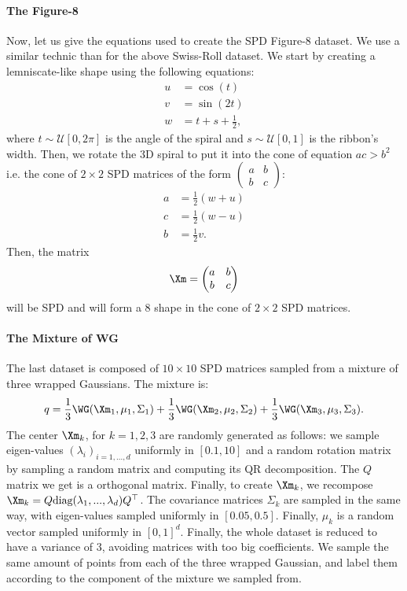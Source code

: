 \documentclass[10pt]{article} %
\theoremstyle{plain}
\theoremstyle{definition}
\theoremstyle{remark}
\begin{document}
\paragraph{The Figure-8}
Now, let us give the equations used to create the SPD Figure-8 dataset. We use a similar technic than for the above Swiss-Roll dataset. We start by creating a lemniscate-like shape using the following equations:
\begin{equation}
  \begin{aligned}
    u &= \cos(t) \\
    v &= \sin(2t) \\
    w &= t + s + \frac{1}{2},
  \end{aligned}
\end{equation}
where $t \sim \mathcal{U}[0, 2\pi]$ is the angle of the spiral and $s \sim \mathcal{U}[0, 1]$ is the ribbon's width. Then, we rotate the 3D spiral to put it into the cone of equation $ac > b^2$ i.e. the cone of $2 \times 2$ SPD matrices of the form $
\begin{pmatrix}a&b\\b&c
\end{pmatrix}$:
\begin{equation}
  \begin{aligned}
    a &= \frac{1}{2}(w+u) \\
    c &= \frac{1}{2}(w-u) \\
    b &= \frac{1}{2}v.
  \end{aligned}
\end{equation}
Then, the matrix $$\Xm =
\begin{pmatrix}a&b\\b&c
\end{pmatrix}$$
will be SPD and will form a 8 shape in the cone of $2 \times 2$ SPD matrices.

\paragraph{The Mixture of WG}
The last dataset is composed of $10 \times 10$ SPD matrices sampled from a mixture of three wrapped Gaussians. The mixture is:
$$q = \frac{1}{3}\WG(\Xm_1, \mu_1, \Sigma_1) + \frac{1}{3}\WG(\Xm_2, \mu_2, \Sigma_2) + \frac{1}{3}\WG(\Xm_3, \mu_3, \Sigma_3).$$
The center $\Xm_k$, for $k = 1,2,3$ are randomly generated as follows: we sample eigen-values $(\lambda_i)_{i = 1,...,d}$ uniformly in $[0.1, 10]$ and a random rotation matrix by sampling a random matrix and computing its QR decomposition. The $Q$ matrix we get is a orthogonal matrix. Finally, to create $\Xm_k$, we recompose $\Xm_k = Q \text{diag}(\lambda_1,...,\lambda_d)Q^\top$. The covariance matrices $\Sigma_k$ are sampled in the same way, with eigen-values sampled uniformly in $[0.05, 0.5]$. Finally,  $\mu_k$ is a random vector sampled uniformly in $[0,1]^d$. Finally, the whole dataset is reduced to have a variance of $3$, avoiding matrices with too big coefficients. We sample the same amount of points from each of the three wrapped Gaussian, and label them according to the component of the mixture we sampled from.
\end{document}
